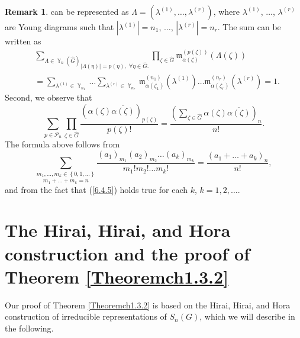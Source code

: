 \documentclass[12pt]{amsart}
\theoremstyle{definition}
\newtheorem{rem}[thm]{Remark}
\numberwithin{equation}{section}
\DeclareMathOperator{\Y}{\mathbb{Y}}
\begin{document}
\begin{rem}
can be represented as $\Lambda=\left(\lambda^{(1)},\ldots,\lambda^{(r)}\right)$, where
$\lambda^{(1)}$, $\ldots$, $\lambda^{(r)}$ are Young diagrams such that
$|\lambda^{(1)}|=n_1$, $\ldots$, $|\lambda^{(r)}|=n_r$. The  sum can be written as
\begin{equation}
\begin{split}
&\underset{|\Lambda(\eta)|=p(\eta),\; \forall\eta\in\widehat{G}.}{\sum\limits_{\Lambda\in\Y_n\left(\widehat{G}\right)}}
\prod\limits_{\zeta\in\widehat{G}}\mathfrak{m}_{\alpha(\zeta)}^{(p(\zeta))}
\left(\Lambda(\zeta)\right)\\
&=\sum\limits_{\lambda^{(1)}\in\Y_{n_1}}\ldots\sum\limits_{\lambda^{(r)}\in\Y_{n_r}}\mathfrak{m}_{\alpha(\zeta_1)}^{(n_1)}(\lambda^{(1)})\ldots
\mathfrak{m}_{\alpha(\zeta_r)}^{(n_r)}(\lambda^{(r)})=1.
\end{split}
\end{equation}
Second, we observe that
\begin{equation}\label{6.4.4}
\sum\limits_{p\in\mathcal{P}_n}
\prod\limits_{\zeta\in\widehat{G}}
\frac{\left(\alpha(\zeta)
\overline{\alpha(\zeta)}\right)_{p(\zeta)}}{p(\zeta)!}
=\frac{\left(\sum\limits_{\zeta\in\widehat{G}}\alpha(\zeta)\overline{\alpha(\zeta)}\right)_n}{n!}.
\end{equation}
The formula above follows from
\begin{equation}\label{6.4.5}
\underset{m_1+\ldots+m_k=n}{\sum\limits_{m_1,\ldots,m_k\in\left\{0,1,\ldots\right\}}}
\frac{(a_1)_{m_1}(a_2)_{m_2}\ldots (a_k)_{m_k}}{m_1!m_2!\ldots m_k!}=\frac{(a_1+\ldots+a_k)_n}{n!},
\end{equation}
and from the fact that (\ref{6.4.5}) holds true for each $k$, $k=1,2,\ldots$.
\end{rem}

\section{The Hirai, Hirai, and Hora construction and the proof of Theorem \ref{Theoremch1.3.2}}\label{SECTIONPROOFTHEOREMCH}
Our proof of Theorem \ref{Theoremch1.3.2} is based on the Hirai, Hirai, and Hora construction of irreducible representations of $S_n(G)$, which we will describe in the following.
\end{document}
